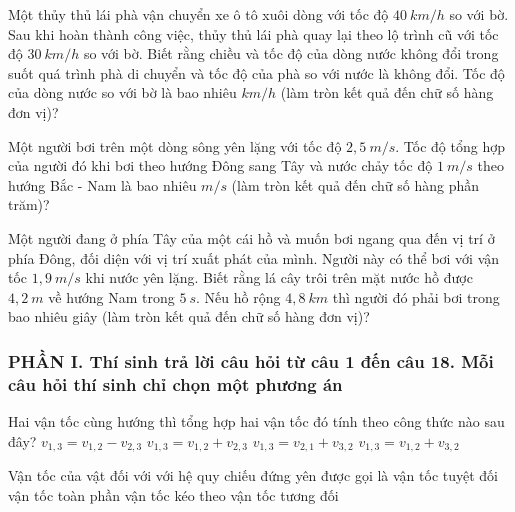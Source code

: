 \begin{ex}%
Một thủy thủ lái phà vận chuyển xe ô tô xuôi dòng với tốc độ $40\ km/h$ so với bờ. Sau khi hoàn thành công việc, thủy thủ lái phà quay lại theo lộ trình cũ với tốc độ $30\ km/h$ so với bờ. Biết rằng chiều và tốc độ của dòng nước không đổi trong suốt quá trình phà di chuyển và tốc độ của phà so với nước là không đổi. Tốc độ của dòng nước so với bờ là bao nhiêu $km/h$ (làm tròn kết quả đến chữ số hàng đơn vị)?
\loigiai{
}
\end{ex}
\begin{ex}%
Một người bơi trên một dòng sông yên lặng với tốc độ $2,5\ m/s$. Tốc độ tổng hợp của người đó khi bơi theo hướng Đông sang Tây và nước chảy tốc độ $1\ m/s$ theo hướng Bắc - Nam là bao nhiêu $m/s$ (làm tròn kết quả đến chữ số hàng phần trăm)?
\loigiai{
}
\end{ex}
\begin{ex}%
Một người đang ở phía Tây của một cái hồ và muốn bơi ngang qua đến vị trí ở phía Đông, đối diện với vị trí xuất phát của mình. Người này có thể bơi với vận tốc $1,9\ m/s$ khi nước yên lặng. Biết rằng lá cây trôi trên mặt nước hồ được $4,2\ m$ về hướng Nam trong $5\ s$. Nếu hồ rộng $4,8\ km$ thì người đó phải bơi trong bao nhiêu giây (làm tròn kết quả đến chữ số hàng đơn vị)?
\loigiai{
}
\end{ex}









\newpage 
{}
\subsubsection*{PHẦN I. Thí sinh trả lời câu hỏi từ câu 1 đến câu 18. Mỗi câu hỏi thí sinh chỉ chọn một phương án}
\setcounter{ex}{0}

\begin{ex}%
Hai vận tốc cùng hướng thì tổng hợp hai vận tốc đó tính theo công thức nào sau đây?
\choice
{$v_{1,3}=v_{1,2}-v_{2,3}$}
{\True $v_{1,3}=v_{1,2}+v_{2,3}$}
{$v_{1,3}=v_{2,1}+v_{3,2}$}
{$v_{1,3}=v_{1,2}+v_{3,2}$}

 \end{ex}


\begin{ex}%
Vận tốc của vật đối với với hệ quy chiếu đứng yên được gọi là
\choice
{\True vận tốc tuyệt đối}
{vận tốc toàn phần}
{vận tốc kéo theo}
{vận tốc tương đối}

 \end{ex}


